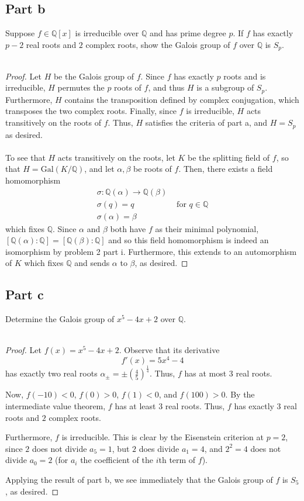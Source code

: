 \documentclass[12pt,reqno]{amsart}
\newcommand{\Q}{\mathbb{Q}}
\begin{document}
\subsection*{Part b}
Suppose $f\in \Q[x]$ is irreducible over $\Q$ and has prime degree $p$. If $f$
has exactly $p-2$ real roots and $2$ complex roots, show the Galois group of $f$
over $\Q$ is $S_p$.
\\
\\
\begin{proof}
    Let $H$ be the Galois group of $f$. Since $f$ has exactly $p$ roots and is
    irreducible, $H$ permutes the $p$ roots of $f$, and thus $H$ is a subgroup of
    $S_p$. Furthermore, $H$ contains the transposition defined by complex
    conjugation, which transposes the two complex roots. Finally, since $f$
    is irreducible, $H$ acts transitively on the roots of $f$. Thus, $H$
    satisfies the criteria of part a, and $H=S_p$ as desired.
    \\
    \\
    To see that $H$ acts transitively on the roots, let $K$ be the splitting
    field of $f$, so that $H=\text{Gal}(K/\Q)$, and let $\alpha,\beta$ be roots
    of $f$. Then, there exists a field homomorphism
    \[
\begin{aligned}
    \sigma:\Q(\alpha)\to \Q(\beta)\\
    \sigma(q)=q &\text{ for }q\in \Q\\
    \sigma(\alpha)=\beta
\end{aligned}
    \]
    which fixes $\Q$. Since $\alpha$ and $\beta$ both have $f$ as their minimal
    polynomial, $[\Q(\alpha):\Q] = [\Q(\beta):\Q]$ and so this field
    homomorphism is indeed an isomorphism by problem 2 part i. Furthermore, this
    extends to an automorphism of $K$ which fixes $\Q$ and sends $\alpha$ to
    $\beta$, as desired.
\end{proof}

\subsection*{Part c}
Determine the Galois group of $x^5-4x+2$ over $\Q$.
\\
\\
\begin{proof}
    Let $f(x) = x^5-4x+2$. Observe that its derivative
    \[
        f'(x) = 5x^4-4
    \]
    has exactly two real roots  $\alpha_{\pm}=\pm(\frac{4}{5})^{\frac{1}{4}}$.
    Thus, $f$ has at most $3$ real roots.

    Now, $f(-10)<0$, $f(0)>0$, $f(1)<0$, and $f(100)>0$. By the
    intermediate value theorem, $f$ has at least $3$ real roots. Thus, $f$ has
    exactly $3$ real roots and $2$ complex roots. 
    
    Furthermore, $f$ is irreducible. This is clear by the Eisenstein criterion
    at $p=2$, since $2$ does not divide $a_5=1$, but $2$ does divide $a_1=4$, and $2^2 =
    4$ does not divide $a_0 = 2$ (for $a_i$ the coefficient of the $i$th term of
    $f$).

    Applying the result of part b, we see immediately that the Galois group of
    $f$ is $S_5$, as desired.
\end{proof}
\end{document}
